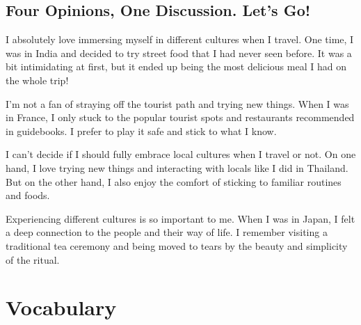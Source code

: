 \documentclass[]{article} %
\begin{document}
\vspace{1cm}
\begin{minipage}[h]{0.95\textwidth}
	
	
	\subsection*{Four Opinions, One Discussion. Let's Go!}
	\begin{dialogue}
		
		
		 I absolutely love immersing myself in different cultures when I travel. One time,
		I was in India and decided to try street food that I had never seen before. It was a
		bit intimidating at first, but it ended up being the most delicious meal I had on
		the whole trip! \par 
		 I'm not a fan of straying off the tourist path and trying new things. When I was in
		France, I only stuck to the popular tourist spots and restaurants recommended in
		guidebooks. I prefer to play it safe and stick to what I know. \par 
		
		 I can't decide if I should fully embrace local cultures when I travel or not. On one
		hand, I love trying new things and interacting with locals like I did in Thailand. But
		on the other hand, I also enjoy the comfort of sticking to familiar routines and
		foods. \par 
		 Experiencing different cultures is so important to me. When I was in Japan, I felt
		a deep connection to the people and their way of life. I remember visiting a
		traditional tea ceremony and being moved to tears by the beauty and simplicity
		of the ritual. \par 
		
	\end{dialogue}
	
	
\end{minipage}

\vspace{1cm}




\section*{Vocabulary}
\end{document}
